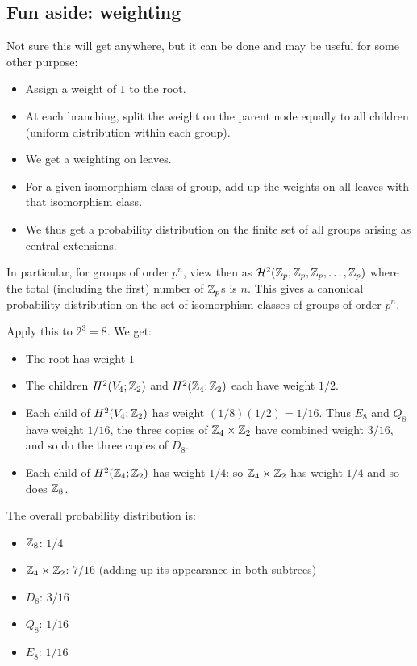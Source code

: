 \documentclass[10pt]{amsart}
\begin{document}
\subsection{Fun aside: weighting}

Not sure this will get anywhere, but it can be done and may be useful for some other purpose:

\begin{itemize}
\item Assign a weight of $1$ to the root.
\item At each branching, split the weight on the parent node equally
  to all children (uniform distribution within each group).
\item We get a weighting on leaves.
\item For a given isomorphism class of group, add up the weights on
  all leaves with that isomorphism class.
\item We thus get a probability distribution on the finite set of all
  groups arising as central extensions.
\end{itemize}

In particular, for groups of order $p^n$, view then as
$\mathcal{H}^2(\mathbb{Z}_p;\mathbb{Z}_p,\mathbb{Z}_p,\dots,\mathbb{Z}_p)$ where the total (including
the first) number of $\mathbb{Z}_p$s is $n$. This gives a canonical
probability distribution on the set of isomorphism classes of groups
of order $p^n$.

Apply this to $2^3 = 8$. We get:

\begin{itemize}
\item The root has weight $1$
\item The children $H^2(V_4;\mathbb{Z}_2)$ and $H^2(\mathbb{Z}_4;\mathbb{Z}_2)$ each have weight $1/2$.
\item Each child of $H^2(V_4;\mathbb{Z}_2)$ has weight $(1/8)(1/2) =
  1/16$. Thus $E_8$ and $Q_8$ have weight $1/16$, the three copies of
  $\mathbb{Z}_4 \times \mathbb{Z}_2$ have combined weight $3/16$, and so do the three
  copies of $D_8$.
\item Each child of $H^2(\mathbb{Z}_4;\mathbb{Z}_2)$ has weight $1/4$: so $\mathbb{Z}_4 \times \mathbb{Z}_2$ has
  weight $1/4$ and so does $\mathbb{Z}_8$.
\end{itemize}

The overall probability distribution is:

\begin{itemize}
\item $\mathbb{Z}_8$: $1/4$
\item $\mathbb{Z}_4 \times \mathbb{Z}_2$: $7/16$ (adding up its appearance in both subtrees)
\item $D_8$: $3/16$
\item $Q_8$: $1/16$
\item $E_8$: $1/16$
\end{itemize}
\end{document}
